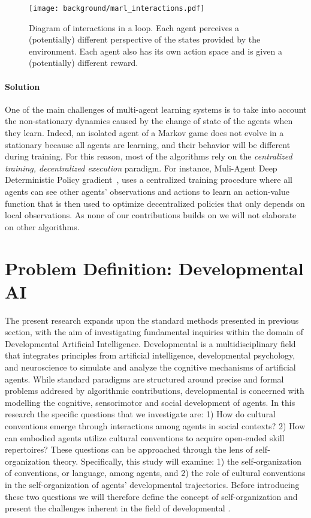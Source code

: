 \begin{figure}[!h]
\centering
\texttt{[image: background/marl\_interactions.pdf]}	
\caption{Diagram of interactions in a \marl loop. Each agent perceives a (potentially) different perspective of the states provided by the environment. Each agent also has its own action space and is given a (potentially) different reward.}
\label{fig:marl_interactions}
\end{figure}

\paragraph{Solution}

One of the main challenges of multi-agent learning systems is to take into account the non-stationary dynamics caused by the change of state of the agents when they learn. Indeed, an isolated agent of a Markov game does not evolve in a stationary \mdp because all agents are learning, and their behavior will be different during training. For this reason, most of the \marl algorithms rely on the \textit{centralized training, decentralized execution} paradigm. For instance, Muli-Agent Deep Deterministic Policy gradient~\citep{lowe2017multi}, uses a centralized training procedure where all agents can see other agents' observations and actions to learn an action-value function that is then used to optimize decentralized policies that only depends on local observations. As none of our contributions builds on \marl we will not elaborate on other \marl algorithms.

\newpage

\section{Problem Definition: Developmental AI}

The present research expands upon the standard \ai methods presented in previous section, with the aim of investigating fundamental inquiries within the domain of \gls{Developmental Artificial Intelligence}. Developmental \ai is a multidisciplinary field that integrates principles from artificial intelligence, developmental psychology, and neuroscience to simulate and analyze the cognitive mechanisms of artificial agents. While standard \ai paradigms are structured around precise and formal problems addresed by algorithmic contributions, developmental \ai is concerned with modelling the cognitive, sensorimotor and social development of agents. In this research the specific questions that we investigate are: 1) How do cultural conventions emerge through interactions among agents in social contexts? 2) How can embodied agents utilize cultural conventions to acquire open-ended skill repertoires? These questions can be approached through the lens of self-organization theory. Specifically, this study will examine: 1) the self-organization of conventions, or language, among agents, and 2) the role of cultural conventions in the self-organization of agents' developmental trajectories. Before introducing these two questions we will therefore define the concept of self-organization and present the challenges inherent in the field of developmental \ai.

